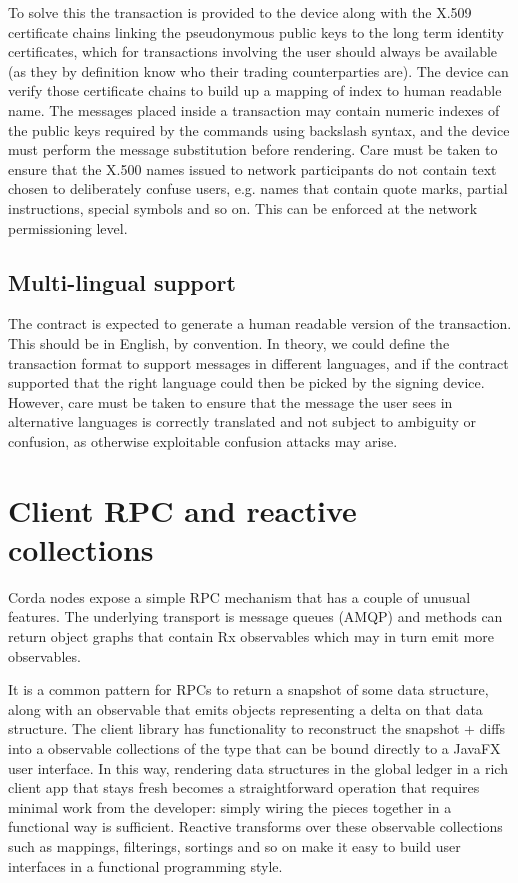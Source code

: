 \documentclass{article}
\begin{document}
To solve this the transaction is provided to the device along with the X.509 certificate chains
linking the pseudonymous public keys to the long term identity certificates, which for transactions involving the user
should always be available (as they by definition know who their trading counterparties are). The device can verify
those certificate chains to build up a mapping of index to human readable name. The messages placed inside a transaction may contain numeric indexes of the public keys required by the
commands using backslash syntax, and the device must perform the message substitution before rendering.
Care must be taken to ensure that the X.500 names issued to network participants do not contain text chosen to
deliberately confuse users, e.g. names that contain quote marks, partial instructions, special symbols and so on.
This can be enforced at the network permissioning level.

\subsection{Multi-lingual support}

The contract is expected to generate a human readable version of the transaction. This should be in English, by
convention. In theory, we could define the transaction format to support messages in different languages, and if
the contract supported that the right language could then be picked by the signing device. However, care must be taken
to ensure that the message the user sees in alternative languages is correctly translated and not subject to ambiguity
or confusion, as otherwise exploitable confusion attacks may arise.

\section{Client RPC and reactive collections}

Corda nodes expose a simple RPC mechanism that has a couple of unusual features. The underlying transport is
message queues (AMQP) and methods can return object graphs that contain Rx observables\cite{Rx} which may in
turn emit more observables.

It is a common pattern for RPCs to return a snapshot of some data structure, along with an observable that emits
objects representing a delta on that data structure. The client library has functionality to reconstruct the
snapshot + diffs into a observable collections of the type that can be bound directly to a JavaFX user interface.
In this way, rendering data structures in the global ledger in a rich client app that stays fresh becomes a
straightforward operation that requires minimal work from the developer: simply wiring the pieces together in
a functional way is sufficient. Reactive transforms over these observable collections such as mappings,
filterings, sortings and so on make it easy to build user interfaces in a functional programming style.
\end{document}

